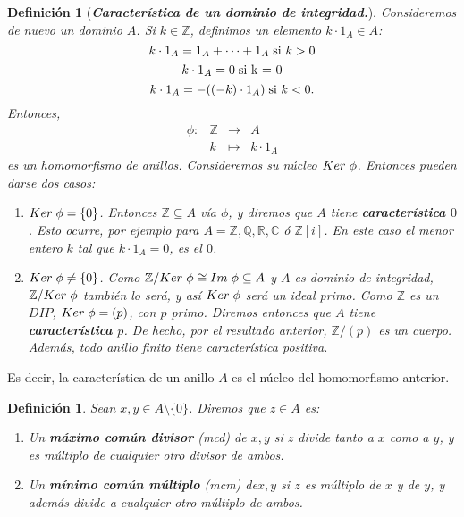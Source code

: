 \documentclass[12pt]{article}
\newtheorem{definition}[theorem]{Definición}
\begin{document}
\begin{definition}[\textbf{\textit{Característica de un dominio de integridad.}}] Consideremos de nuevo un dominio $A$. Si $k \in \mathbb{Z}$, definimos un elemento $k \cdot 1_{A} \in A$: $$k \cdot 1_{A} = 1_{A} + \cdots + 1_{A} \hspace{0.1cm} \text{si $k>0$}$$ $$k \cdot 1_{A} = 0 \hspace{0.1cm} \text{si k = 0}$$ $$k \cdot 1_{A} = -((-k) \cdot 1_{A}) \hspace{0.1cm} \text{si $k<0$}.$$
Entonces, $$\begin{array}{rccl}
\phi \colon &\mathbb{Z}&\longrightarrow &A \\
&k& \longmapsto &k\cdot 1_{A}
\end{array}
$$ es un homomorfismo de anillos. Consideremos su núcleo $Ker \hspace{0.1cm} \phi$. Entonces pueden darse dos casos: \begin{enumerate}
\item $Ker \hspace{0.1cm} \phi = \lbrace 0 \rbrace$. Entonces $\mathbb{Z} \subseteq A$ vía $\phi$, y diremos que $A$ tiene \textbf{característica $0$}. Esto ocurre, por ejemplo para $A = \mathbb{Z}, \mathbb{Q}, \mathbb{R}, \mathbb{C}$ ó $\mathbb{Z}[i]$. En este caso el menor entero $k$ tal que $k \cdot 1_{A} = 0$, es el $0$.
\item $Ker \hspace{0.1cm} \phi \neq \lbrace 0 \rbrace$. Como $\mathbb{Z}/Ker \hspace{0.1cm} \phi \cong Im \hspace{0.1cm} \phi \subseteq A$ y $A$ es dominio de integridad, $\mathbb{Z}/Ker \hspace{0.1cm} \phi$ también lo será, y así $Ker \hspace{0.1cm} \phi$ será un ideal primo. Como $\mathbb{Z}$ es un $DIP$, $Ker \hspace{0.1cm} \phi = (p)$, con $p$ primo. Diremos entonces que $A$ tiene \textbf{característica $p$}. De hecho, por el resultado anterior, $\mathbb{Z}/(p)$ es un cuerpo. Además, todo anillo finito tiene característica positiva.
\end{enumerate}
\end{definition}

Es decir, la característica de un anillo $A$ es el núcleo del homomorfismo anterior.

\begin{definition} Sean $x,y \in A\setminus \lbrace 0 \rbrace$. Diremos que $z \in A$ es: \begin{enumerate}
\item Un \textbf{máximo común divisor} (mcd) de $x,y$ si $z$ divide tanto a $x$ como a $y$, y es múltiplo de cualquier otro divisor de ambos.
\item Un \textbf{mínimo común múltiplo} (mcm) de$x,y$ si $z$ es múltiplo de $x$ y de $y$, y además divide a cualquier otro múltiplo de ambos.
\end{enumerate}
\end{definition}
\end{document}
